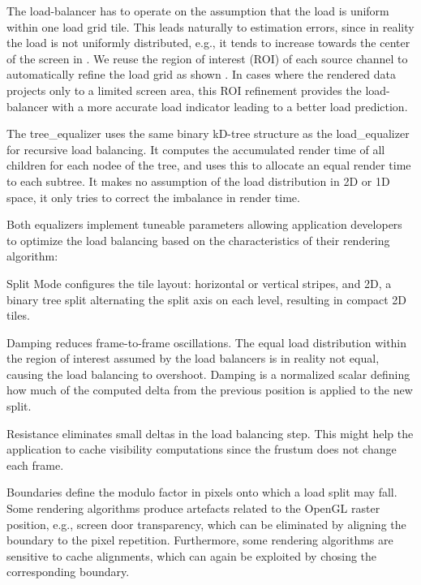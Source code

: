 The load-balancer has to operate on the assumption that the load is uniform
within one load grid tile. This leads naturally to estimation errors, since in
reality the load is not uniformly distributed, e.g., it tends to increase
towards the center of the screen in . We reuse the region of interest
(ROI) of each source channel to automatically refine the load grid as shown
. In cases where the rendered data projects only to a limited screen
area, this ROI refinement provides the load-balancer with a more accurate load
indicator leading to a better load prediction.

The \textsf{tree\_equalizer} uses the same binary kD-tree structure as the
\textsf{load\_equalizer} for recursive load balancing. It computes the
accumulated render time of all children for each nodee of the tree, and uses
this to allocate an equal render time to each subtree. It makes no assumption of
the load distribution in 2D or 1D space, it only tries to correct the imbalance
in render time.

Both equalizers implement tuneable parameters allowing application developers to
optimize the load balancing based on the characteristics of their rendering
algorithm:

\begin{compactdesc}
\item[Split Mode] configures the tile layout: horizontal or vertical stripes,
and 2D, a binary tree split alternating the split axis on each level, resulting
in compact 2D tiles.
\item[Damping] reduces frame-to-frame oscillations. The equal load distribution
within the region of interest assumed by the load balancers is in reality not
equal, causing the load balancing to overshoot. Damping is a normalized scalar
defining how much of the computed delta from the previous position is applied to
the new split.
\item[Resistance] eliminates small deltas in the load balancing step. This might
help the application to cache visibility computations since the frustum does not
change each frame.
\item[Boundaries] define the modulo factor in pixels onto which a load split may
fall. Some rendering algorithms produce artefacts related to the OpenGL raster
position, e.g., screen door transparency, which can be eliminated by aligning
the boundary to the pixel repetition. Furthermore, some rendering algorithms are
sensitive to cache alignments, which can again be exploited by chosing the
corresponding boundary.
\end{compactdesc}


